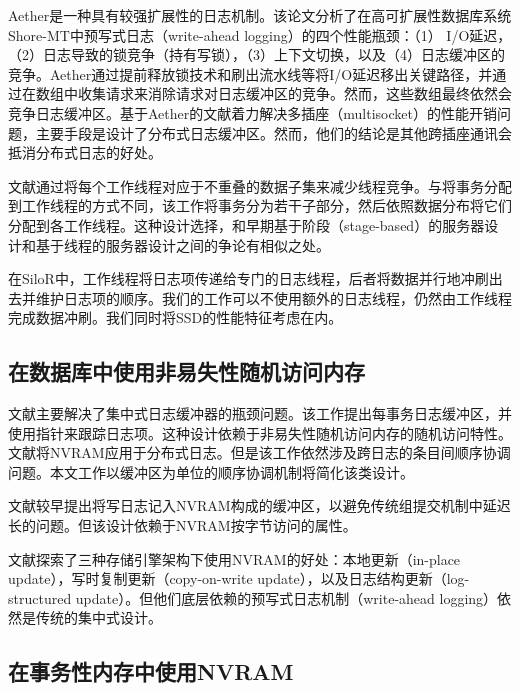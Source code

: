 Aether\cite{Johnson:2010:ASA:1920841.1920928}是一种具有较强扩展性的日志机制。该论文分析了在高可扩展性数据库系统Shore-MT中预写式日志（write-ahead logging）的四个性能瓶颈：（1） I/O延迟，（2）日志导致的锁竞争（持有写锁），（3）上下文切换，以及（4）日志缓冲区的竞争。Aether通过提前释放锁技术和刷出流水线等将I/O延迟移出关键路径，并通过在数组中收集请求来消除请求对日志缓冲区的竞争。然而，这些数组最终依然会竞争日志缓冲区。基于Aether的文献\cite{raey}着力解决多插座（multisocket）的性能开销问题，主要手段是设计了分布式日志缓冲区。然而，他们的结论是其他跨插座通讯会抵消分布式日志的好处。

文献\cite{Pandis:2010:DTE:1920841.1920959}通过将每个工作线程对应于不重叠的数据子集来减少线程竞争。与将事务分配到工作线程的方式不同，该工作将事务分为若干子部分，然后依照数据分布将它们分配到各工作线程。这种设计选择，和早期基于阶段（stage-based）的服务器设计\cite{Welsh:2001:SAW:502034.502057}和基于线程的服务器设计\cite{vonBehren:2003:CST:945445.945471}之间的争论有相似之处。

在SiloR\cite{Zheng:2014:FDF:2685048.2685085}中，工作线程将日志项传递给专门的日志线程，后者将数据并行地冲刷出去并维护日志项的顺序。我们的工作可以不使用额外的日志线程，仍然由工作线程完成数据冲刷。我们同时将SSD的性能特征考虑在内。

\subsection{在数据库中使用非易失性随机访问内存}

文献\cite{Huang:2014:NLT:2735496.2735502}主要解决了集中式日志缓冲器的瓶颈问题。该工作提出每事务日志缓冲区，并使用指针来跟踪日志项。这种设计依赖于非易失性随机访问内存的随机访问特性。文献\cite{Wang:2014:SLT:2732951.2732960}将NVRAM应用于分布式日志。但是该工作依然涉及跨日志的条目间顺序协调问题。本文工作以缓冲区为单位的顺序协调机制将简化该类设计。

文献\cite{5767918}较早提出将写日志记入NVRAM构成的缓冲区，以避免传统组提交机制中延迟长的问题。但该设计依赖于NVRAM按字节访问的属性。

文献\cite{Arulraj:2015:LTS:2723372.2749441}探索了三种存储引擎架构下使用NVRAM的好处：本地更新（in-place update），写时复制更新（copy-on-write update），以及日志结构更新（log-structured update）。但他们底层依赖的预写式日志机制（write-ahead logging）依然是传统的集中式设计。

\subsection{在事务性内存中使用NVRAM}

